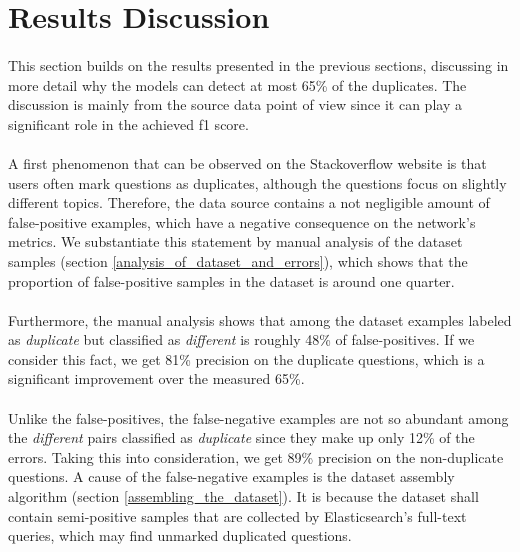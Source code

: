 \section{Results Discussion}
\paragraph{}
This section builds on the results presented in the previous sections, discussing in more detail why the models can detect at most 65\% of the duplicates. The discussion is mainly from the source data point of view since it can play a significant role in the achieved f1 score. 

\paragraph{}
A first phenomenon that can be observed on the Stackoverflow website is that users often mark questions as duplicates, although the questions focus on slightly different topics. Therefore, the data source contains a not negligible amount of false-positive examples, which have a negative consequence on the network's metrics. We substantiate this statement by manual analysis of the dataset samples (section \ref{analysis_of_dataset_and_errors}), which shows that the proportion of false-positive samples in the dataset is around one quarter.

\paragraph{}
Furthermore, the manual analysis shows that among the dataset examples labeled as \textit{duplicate} but classified as \textit{different} is roughly 48\% of false-positives. If we consider this fact, we get 81\% precision on the duplicate questions, which is a significant improvement over the measured 65\%.

\paragraph{}
Unlike the false-positives, the false-negative examples are not so abundant among the \textit{different} pairs classified as \textit{duplicate} since they make up only 12\% of the errors. Taking this into consideration, we get 89\% precision on the non-duplicate questions. A cause of the false-negative examples is the dataset assembly algorithm (section \ref{assembling_the_dataset}). It is because the dataset shall contain semi-positive samples that are collected by Elasticsearch's full-text queries, which may find unmarked duplicated questions.

